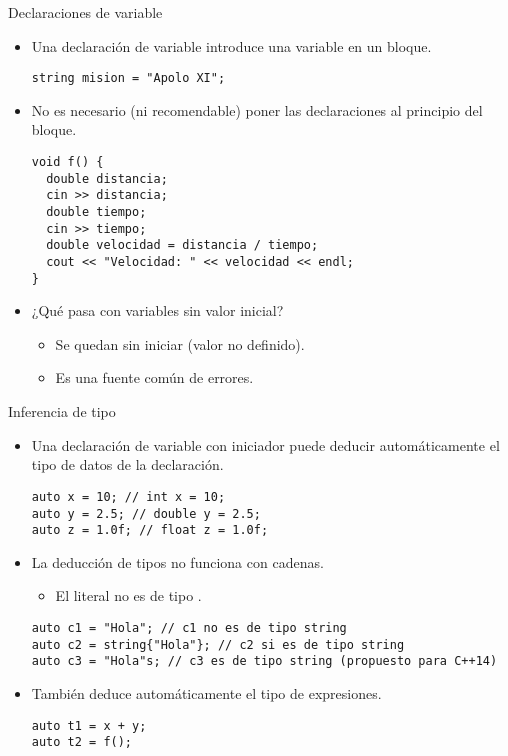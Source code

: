 \begin{frame}[fragile]{Declaraciones de variable}
\begin{itemize}
  \item Una declaración de variable introduce una variable en un bloque.
\begin{lstlisting}
string mision = "Apolo XI";
\end{lstlisting}
  \item No es necesario (ni recomendable) poner las declaraciones al principio del bloque.
\begin{lstlisting}
void f() {
  double distancia;
  cin >> distancia;
  double tiempo;
  cin >> tiempo;
  double velocidad = distancia / tiempo;
  cout << "Velocidad: " << velocidad << endl;
}  
\end{lstlisting}
  \item ¿Qué pasa con variables sin valor inicial?
    \begin{itemize}
      \item Se quedan sin iniciar (valor no definido).
      \item Es una fuente común de errores.
    \end{itemize}
\end{itemize}
\end{frame}

\begin{frame}[fragile]{Inferencia de tipo}
\begin{itemize}
  \item Una declaración de variable con iniciador puede deducir automáticamente
        el tipo de datos de la declaración.
\begin{lstlisting}
auto x = 10; // int x = 10;
auto y = 2.5; // double y = 2.5;
auto z = 1.0f; // float z = 1.0f;
\end{lstlisting}
  \item La deducción de tipos no funciona con cadenas.
    \begin{itemize}
      \item El literal  no es de tipo .
    \end{itemize}
\begin{lstlisting}
auto c1 = "Hola"; // c1 no es de tipo string
auto c2 = string{"Hola"}; // c2 si es de tipo string
auto c3 = "Hola"s; // c3 es de tipo string (propuesto para C++14)
\end{lstlisting}
  \item También deduce automáticamente el tipo de expresiones.
\begin{lstlisting}
auto t1 = x + y;
auto t2 = f();
\end{lstlisting}
\end{itemize}
\end{frame}

